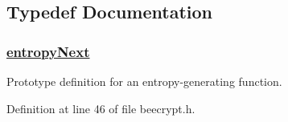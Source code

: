 \subsection{Typedef Documentation}
\hypertarget{group__ES__m_ga0}{
\subsubsection[entropyNext]{\setlength{\rightskip}{0pt plus 5cm}\hyperlink{group__ES__m_ga0}{entropy\-Next}}}
\label{group__ES__m_ga0}


Prototype definition for an entropy-generating function. 

Definition at line 46 of file beecrypt.h.